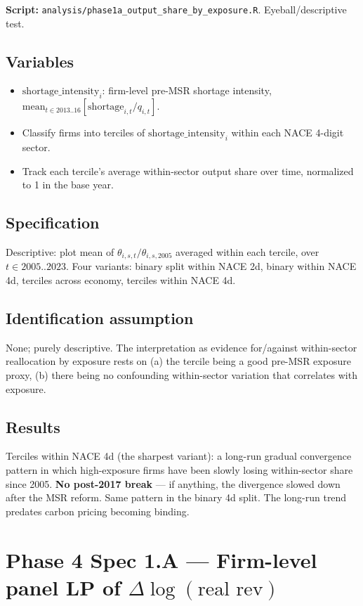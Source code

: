 \documentclass[11pt]{article}
\begin{document}
\textbf{Script:} \texttt{analysis/phase1a\_output\_share\_by\_exposure.R}. Eyeball/descriptive test.

\subsection{Variables}
\begin{itemize}
  \item $\mathrm{shortage\_intensity}_i$: firm-level pre-MSR shortage intensity, $\mathrm{mean}_{t \in 2013..16}[\mathrm{shortage}_{i,t} / q_{i,t}]$.
  \item Classify firms into terciles of $\mathrm{shortage\_intensity}_i$ within each NACE 4-digit sector.
  \item Track each tercile's average within-sector output share over time, normalized to 1 in the base year.
\end{itemize}

\subsection{Specification}
Descriptive: plot mean of $\theta_{i,s,t} / \theta_{i,s,2005}$ averaged within each tercile, over $t \in 2005..2023$. Four variants: binary split within NACE 2d, binary within NACE 4d, terciles across economy, terciles within NACE 4d.

\subsection{Identification assumption}
None; purely descriptive. The interpretation as evidence for/against within-sector reallocation by exposure rests on (a) the tercile being a good pre-MSR exposure proxy, (b) there being no confounding within-sector variation that correlates with exposure.

\subsection{Results}
Terciles within NACE 4d (the sharpest variant): a long-run gradual convergence pattern in which high-exposure firms have been slowly losing within-sector share since 2005. \textbf{No post-2017 break} --- if anything, the divergence slowed down after the MSR reform. Same pattern in the binary 4d split. The long-run trend predates carbon pricing becoming binding.

\section{Phase 4 Spec 1.A --- Firm-level panel LP of $\Delta\log(\text{real rev})$}
\label{sec:phase4}
\end{document}
